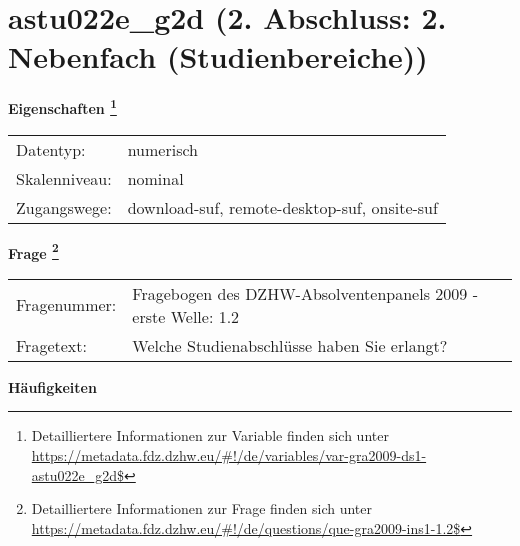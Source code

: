 
    \setcounter{footnote}{0}

    \vspace*{-1.8cm}
	\section{astu022e\_g2d (2. Abschluss: 2. Nebenfach (Studienbereiche))}
	\label{section:astu022e_g2d}



    \vspace*{0.5cm}
    \noindent\textbf{Eigenschaften
	\footnote{Detailliertere Informationen zur Variable finden sich unter
		\url{https://metadata.fdz.dzhw.eu/\#!/de/variables/var-gra2009-ds1-astu022e_g2d$}}}\\
	\begin{tabularx}{\hsize}{@{}lX}
	Datentyp: & numerisch \\
	Skalenniveau: & nominal \\
	Zugangswege: &
	  download-suf, 
	  remote-desktop-suf, 
	  onsite-suf
 \\
    \end{tabularx}



				\vspace*{0.5cm}
                \noindent\textbf{Frage
	                \footnote{Detailliertere Informationen zur Frage finden sich unter
		              \url{https://metadata.fdz.dzhw.eu/\#!/de/questions/que-gra2009-ins1-1.2$}}}\\
				\begin{tabularx}{\hsize}{@{}lX}
					Fragenummer: &
					  Fragebogen des DZHW-Absolventenpanels 2009 - erste Welle:
					  1.2
 \\
					Fragetext: & Welche Studienabschlüsse haben Sie erlangt? \\
				\end{tabularx}





        		\vspace*{0.5cm}
                \noindent\textbf{Häufigkeiten}

